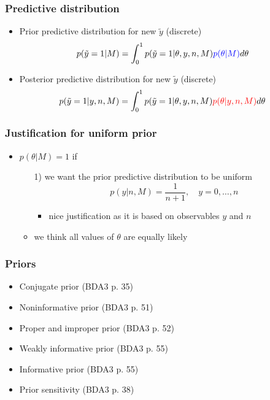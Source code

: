 \documentclass[10pt,handout]{beamer}
\begin{document}
\begin{frame}
  \frametitle{Predictive distribution}

  \begin{itemize}
  \item {\color{blue} Prior predictive} distribution for new $\tilde{y}$ (discrete)
    \begin{align*}
      p(\tilde{y}=1|M) &= \int_0^1 p(\tilde{y}=1|\theta,y,n,M){\color{blue}p(\theta|M)}d\theta
    \end{align*}
  \item {\color{red} Posterior predictive} distribution for new $\tilde{y}$ (discrete)
    \begin{align*}
      p(\tilde{y}=1|y,n,M) &= \int_0^1 p(\tilde{y}=1|\theta,y,n,M){\color{red}p(\theta|y,n,M)}d\theta
    \end{align*}
  \end{itemize}
\end{frame}

\begin{frame}
  \frametitle{Justification for uniform prior}

  \begin{itemize}
  \item $p(\theta|M)=1$ if
    \begin{itemize}
    \item[1)] we want the prior predictive distribution to be uniform
      \begin{equation*}
        p(y|n,M) = \frac{1}{n+1}, \quad y=0,\ldots,n
      \end{equation*}
      \begin{itemize}
      \item nice justification as it is based on observables $y$ and $n$
      \end{itemize}
     \item<2->[2)] we think all values of $\theta$ are equally likely
    \end{itemize}
  \end{itemize}

\end{frame}


\begin{frame}
  \frametitle{Priors}

  \begin{itemize}
  \item Conjugate prior (BDA3 p. 35)
  \item Noninformative prior (BDA3 p. 51)
  \item Proper and improper prior (BDA3 p. 52)
  \item Weakly informative prior (BDA3 p. 55)
  \item Informative prior (BDA3 p. 55)
  \item Prior sensitivity (BDA3 p. 38)
  \end{itemize}

\end{frame}
\end{document}
